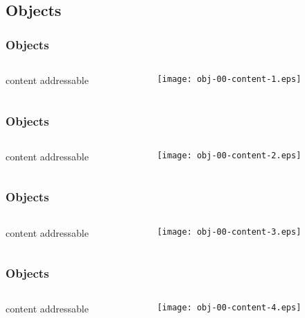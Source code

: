 \documentclass[english]{beamer}
\newcommand{\mysubsection}[2]{%
  \hypertarget{#2}{}%
  \subsection{#1}%
  \label{#2}%
}
\begin{document}
\mysubsection{Objects}{using:objects}
\begin{frame}
\frametitle{Objects}
\begin{columns}[t]
        \begin{column}[T]{.5\textwidth}
                content addressable
        \end{column}
        \begin{column}[T]{.5\textwidth}
                \texttt{[image: obj-00-content-1.eps]}
        \end{column}
\end{columns}
\end{frame}

\begin{frame}
\frametitle{Objects}
\begin{columns}[t]
        \begin{column}[T]{.5\textwidth}
                content addressable
        \end{column}
        \begin{column}[T]{.5\textwidth}
                \texttt{[image: obj-00-content-2.eps]}
        \end{column}
\end{columns}
\end{frame}

\begin{frame}
\frametitle{Objects}
\begin{columns}[t]
        \begin{column}[T]{.5\textwidth}
                content addressable
        \end{column}
        \begin{column}[T]{.5\textwidth}
                \texttt{[image: obj-00-content-3.eps]}
        \end{column}
\end{columns}
\end{frame}

\begin{frame}
\frametitle{Objects}
\begin{columns}[t]
        \begin{column}[T]{.5\textwidth}
                content addressable
        \end{column}
        \begin{column}[T]{.5\textwidth}
                \texttt{[image: obj-00-content-4.eps]}
        \end{column}
\end{columns}
\end{frame}
\end{document}
